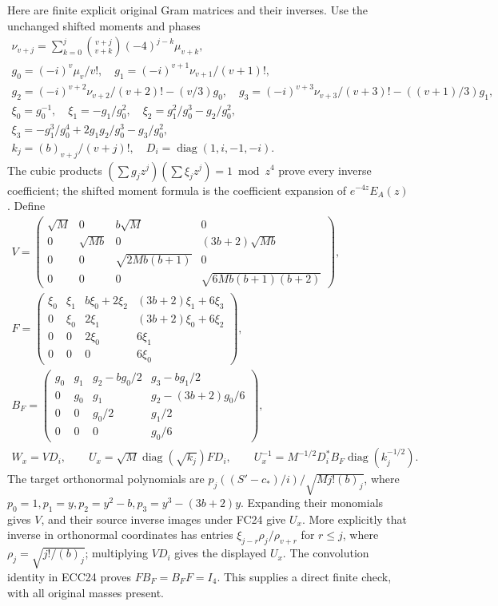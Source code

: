 \documentclass[11pt]{article}
\newcommand{\diag}{\operatorname{diag}}
\begin{document}
Here are finite explicit original Gram matrices and their inverses.
Use the unchanged shifted moments and phases
\begin{equation}
 \begin{gathered}
 \nu_{v+j}=\sum_{k=0}^{j}\binom{v+j}{v+k}(-4)^{j-k}\mu_{v+k},\\
 g_0=(-i)^v\mu_v/v!,\quad g_1=(-i)^{v+1}\nu_{v+1}/(v+1)!,\\
 g_2=(-i)^{v+2}\nu_{v+2}/(v+2)!-(v/3)g_0,\quad
 g_3=(-i)^{v+3}\nu_{v+3}/(v+3)!-((v+1)/3)g_1,\\
 \xi_0=g_0^{-1},\quad\xi_1=-g_1/g_0^2,\quad
 \xi_2=g_1^2/g_0^3-g_2/g_0^2,\\
 \xi_3=-g_1^3/g_0^4+2g_1g_2/g_0^3-g_3/g_0^2,\\
 k_j=(b)_{v+j}/(v+j)!,\quad D_i=\diag(1,i,-1,-i).
 \end{gathered}\tag{ECC24}
\end{equation}
The cubic products $(\sum g_jz^j)(\sum\xi_jz^j)=1\bmod z^4$
prove every inverse coefficient; the shifted moment formula is the
coefficient expansion of $e^{-4z}E_A(z)$. Define
\begin{equation}
 \begin{gathered}
 V=\begin{pmatrix}\sqrt M&0&b\sqrt M&0\\
 0&\sqrt{Mb}&0&(3b+2)\sqrt{Mb}\\
 0&0&\sqrt{2Mb(b+1)}&0\\0&0&0&\sqrt{6Mb(b+1)(b+2)}\end{pmatrix},\\
 F=\begin{pmatrix}\xi_0&\xi_1&b\xi_0+2\xi_2&(3b+2)\xi_1+6\xi_3\\
 0&\xi_0&2\xi_1&(3b+2)\xi_0+6\xi_2\\
 0&0&2\xi_0&6\xi_1\\0&0&0&6\xi_0\end{pmatrix},\\
 B_F=\begin{pmatrix}g_0&g_1&g_2-bg_0/2&g_3-bg_1/2\\
 0&g_0&g_1&g_2-(3b+2)g_0/6\\0&0&g_0/2&g_1/2\\0&0&0&g_0/6\end{pmatrix},\\
 W_x=VD_i,\qquad U_x=\sqrt M\diag(\sqrt{k_j})FD_i,\qquad
 U_x^{-1}=M^{-1/2}D_i^*B_F\diag(k_j^{-1/2}).
 \end{gathered}\tag{ECC25}
\end{equation}
The target orthonormal polynomials are $p_j((S'-c_*)/i)/\sqrt{Mj!(b)_j}$,
where $p_0=1,p_1=y,p_2=y^2-b,p_3=y^3-(3b+2)y$.
Expanding their monomials gives $V$, and their source inverse images
under FC24 give $U_x$. More explicitly that inverse in orthonormal
coordinates has entries $\xi_{j-r}\rho_j/\rho_{v+r}$ for $r\le j$, where
$\rho_j=\sqrt{j!/(b)_j}$; multiplying $VD_i$ gives the displayed $U_x$.
The convolution identity in ECC24 proves $FB_F=B_FF=I_4$.
This supplies a direct finite check, with all original masses present.
\end{document}
